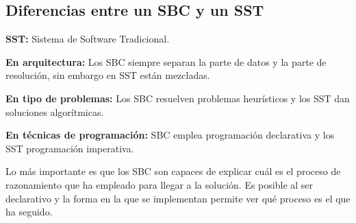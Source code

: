 \documentclass[12pt, twoside, openright]{report} %
\begin{document}
\subsection{Diferencias entre un SBC y un SST}
\textbf{SST:} Sistema de Software Tradicional.

\textbf{En arquitectura:} Los SBC siempre separan la parte de datos y la parte de resolución, sin embargo en SST están mezcladas.

\textbf{En tipo de problemas:} Los SBC resuelven problemas heurísticos y los SST dan soluciones algorítmicas.

\textbf{En técnicas de programación:} SBC emplea programación declarativa y los SST programación imperativa.

Lo más importante es que los SBC son capaces de explicar cuál es el proceso de razonamiento que ha empleado para llegar a la solución. Es posible al ser declarativo y la forma en la que se implementan permite ver qué proceso es el que ha seguido.
\end{document}
